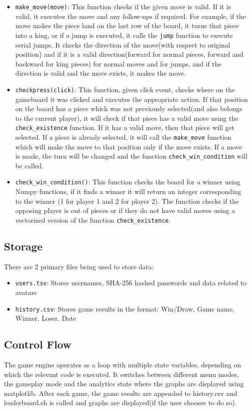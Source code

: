 \documentclass[12pt, letter]{article}
\begin{document}
\begin{itemize}
    \item  \texttt{make\_move(move)}: This function checks if the given move is valid. If it is valid, it executes the move and any follow-ups if required. For example, if the move makes the piece land on the last row of the board, it turns that piece into a king, or if a jump is executed, it calls the \texttt{jump} function to execute serial jumps. It checks the direction of the move(with respect to original position) and if it is a valid direction(forward for normal pieces, forward and backward for king pieces) for normal moves and for jumps, and if the direction is valid and the move exists, it makes the move.
    \item \texttt{checkpress(click)}: This function, given click event, checks where on the gameboard it was clicked and executes the appropriate action. If that position on the board has a piece which was not previously selected(and also belongs to the current player), it will check if that piece has a valid move using the \texttt{check\_existence} function. If it has a valid move, then that piece will get selected. If a piece is already selected, it will call the \texttt{make\_move} function which will make the move to that position only if the move exists. If a move is made, the turn will be changed and the function \texttt{check\_win\_condition} will be called.
    \item \texttt{check\_win\_condition()}: This function checks the board for a winner using Numpy functions, if it finds a winner it will return an integer corresponding to the winner (1 for player 1 and 2 for player 2). The function checks if the opposing player is out of pieces or if they do not have valid moves using a vectorized version of the function \texttt{check\_existence}.
\end{itemize}

\subsection{Storage}
There are 2 primary files being used to store data:
\begin{itemize}
    \item \texttt{users.tsv}: Stores usernames, SHA-256 hashed passwords and data related to avatars
    \item \texttt{history.csv}: Stores game results in the format: Win/Draw, Game name, Winner, Loser, Date
\end{itemize}

\subsection{Control Flow}
The game engine operates as a loop with multiple state variables, depending on which the relevant code is executed. It switches between different menu modes, the gameplay mode and the analytics state where the graphs are displayed using matplotlib. After each game, the game results are appended to history.csv and leaderboard.sh is called and graphs are displayed(if the user chooses to do so).
\end{document}
